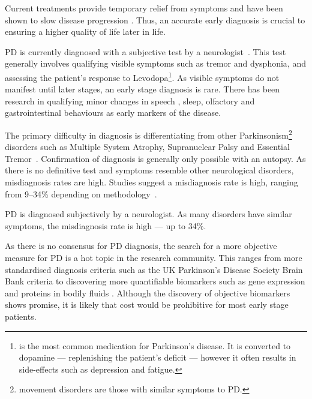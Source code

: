 \documentclass[12pt, twoside]{book}
\renewcommand\emph[1]{\textit{\color{USred}{#1}}}
\begin{document}
Current treatments provide temporary relief from symptoms and have been shown to slow disease progression \cite{slowprog1, slowprog2, slowprog3} . Thus, an accurate early diagnosis is crucial to ensuring a higher quality of life later in life. 

PD is currently diagnosed with a subjective test by a neurologist~\cite{tolosadiagnosis26}. This test generally involves qualifying visible symptoms such as tremor and dysphonia, and assessing the patient's response to Levodopa\footnote{\emph{Levodopa} is the most common medication for Parkinson's disease. It is converted to dopamine --- replenishing the patient's deficit --- however it often results in side-effects such as depression and fatigue.}. As visible symptoms do not manifest until later stages, an early stage diagnosis is rare. There has been research in qualifying minor changes in speech \cite{hazan2012,earlyvowel}, sleep, olfactory and gastrointestinal behaviours \cite{earlynonmotor, genemarkers} as early markers of the disease. 


The primary difficulty in diagnosis is differentiating from other Parkinsonism\footnote{\emph{Parkinsonism} movement disorders are those with similar symptoms to PD.} disorders such as Multiple System Atrophy, Supranuclear Palsy and Essential Tremor~\cite{parkinsonismdifferential1}. Confirmation of diagnosis is generally only possible with an autopsy. As there is no definitive test and symptoms resemble other neurological disorders, misdiagnosis rates are high. Studies suggest a misdiagnosis rate is high, ranging from 9--34\% depending on methodology~\cite{tolosadiagnosis26, brooksdiagnosis25, jankovic2000evolution}. 


\begin{highlight}[Diagnosis]
PD is diagnosed subjectively by a neurologist. As many disorders have similar symptoms, the misdiagnosis rate is high --- up to 34\%.
\end{highlight}

As there is no consensus for PD diagnosis, the search for a more objective measure for PD is a hot topic in the research community. This ranges from more standardised diagnosis criteria such as the UK Parkinson's Disease Society Brain Bank criteria \cite{tolosadiagnosis26,brainbank,hughesdiagnosis100} to discovering more quantifiable biomarkers such as gene expression \cite{genemarkers, genome} and proteins in bodily fluids \cite{biomarkerfluid}. Although the discovery of objective biomarkers shows promise, it is likely that cost would be prohibitive for most early stage patients.
\end{document}
